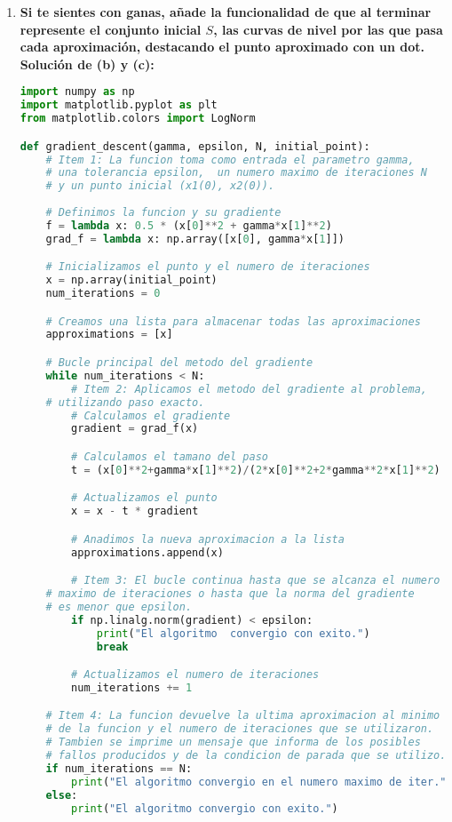 \begin{enumerate}
\begin{enumerate}[\bfseries (a)]
\begin{itemize}
	    \end{itemize}


	\item \textbf{Si te sientes con ganas, añade la funcionalidad de que al terminar represente el conjunto inicial $S$, las curvas de nivel por las que pasa cada aproximación, destacando el punto aproximado con un dot.}\\

	    \textbf{Solución de (b) y (c):}
\begin{lstlisting}[language=Python]
import numpy as np
import matplotlib.pyplot as plt
from matplotlib.colors import LogNorm

def gradient_descent(gamma, epsilon, N, initial_point):
    # Item 1: La funcion toma como entrada el parametro gamma,
    # una tolerancia epsilon,  un numero maximo de iteraciones N 
    # y un punto inicial (x1(0), x2(0)).
    
    # Definimos la funcion y su gradiente
    f = lambda x: 0.5 * (x[0]**2 + gamma*x[1]**2)
    grad_f = lambda x: np.array([x[0], gamma*x[1]])

    # Inicializamos el punto y el numero de iteraciones
    x = np.array(initial_point)
    num_iterations = 0

    # Creamos una lista para almacenar todas las aproximaciones
    approximations = [x]

    # Bucle principal del metodo del gradiente
    while num_iterations < N:
        # Item 2: Aplicamos el metodo del gradiente al problema, 
	# utilizando paso exacto.
        # Calculamos el gradiente
        gradient = grad_f(x)

        # Calculamos el tamano del paso
        t = (x[0]**2+gamma*x[1]**2)/(2*x[0]**2+2*gamma**2*x[1]**2)

        # Actualizamos el punto
        x = x - t * gradient

        # Anadimos la nueva aproximacion a la lista
        approximations.append(x)

        # Item 3: El bucle continua hasta que se alcanza el numero
	# maximo de iteraciones o hasta que la norma del gradiente 
	# es menor que epsilon.
        if np.linalg.norm(gradient) < epsilon:
            print("El algoritmo  convergio con exito.")
            break

        # Actualizamos el numero de iteraciones
        num_iterations += 1

    # Item 4: La funcion devuelve la ultima aproximacion al minimo 
    # de la funcion y el numero de iteraciones que se utilizaron. 
    # Tambien se imprime un mensaje que informa de los posibles
    # fallos producidos y de la condicion de parada que se utilizo.
    if num_iterations == N:
        print("El algoritmo convergio en el numero maximo de iter.")
    else:
        print("El algoritmo convergio con exito.")


\end{lstlisting}
\end{enumerate}
\end{enumerate}
